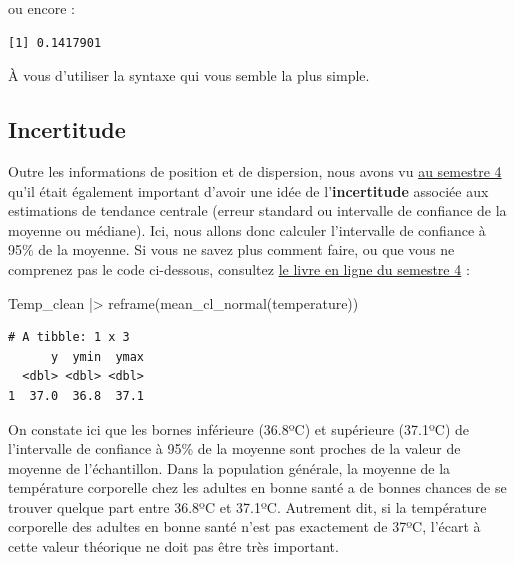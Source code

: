 \documentclass[
  french,
  a4paper,
  DIV=11,
  numbers=noendperiod,
  oneside]{scrreprt}
\newenvironment{Shaded}{}{}
\newcommand{\FunctionTok}[1]{\textcolor[rgb]{0.44,0.26,0.76}{#1}}
\newcommand{\NormalTok}[1]{\textcolor[rgb]{0.14,0.16,0.18}{#1}}
\newcommand{\SpecialCharTok}[1]{\textcolor[rgb]{0.00,0.36,0.77}{#1}}
\begin{document}
ou encore :

\begin{Shaded}
\end{Shaded}

\begin{verbatim}
[1] 0.1417901
\end{verbatim}

À vous d'utiliser la syntaxe qui vous semble la plus simple.

\subsection{Incertitude}\label{sec-ic95}

Outre les informations de position et de dispersion, nous avons vu
\href{https://besibo.github.io/BiometrieS4/02-incertitude.html\#la-notion-dincertitude}{au
semestre 4} qu'il était également important d'avoir une idée de
l'\textbf{incertitude} associée aux estimations de tendance centrale
(erreur standard ou intervalle de confiance de la moyenne ou médiane).
Ici, nous allons donc calculer l'intervalle de confiance à 95\% de la
moyenne. Si vous ne savez plus comment faire, ou que vous ne comprenez
pas le code ci-dessous, consultez
\href{https://besibo.github.io/BiometrieS4/02-incertitude.html\#sec-confint}{le
livre en ligne du semestre 4} :

\begin{Shaded}
\begin{Highlighting}[]
\NormalTok{Temp\_clean }\SpecialCharTok{|\textgreater{}} 
  \FunctionTok{reframe}\NormalTok{(}\FunctionTok{mean\_cl\_normal}\NormalTok{(temperature))}
\end{Highlighting}
\end{Shaded}

\begin{verbatim}
# A tibble: 1 x 3
      y  ymin  ymax
  <dbl> <dbl> <dbl>
1  37.0  36.8  37.1
\end{verbatim}

On constate ici que les bornes inférieure (36.8ºC) et supérieure
(37.1ºC) de l'intervalle de confiance à 95\% de la moyenne sont proches
de la valeur de moyenne de l'échantillon. Dans la population générale,
la moyenne de la température corporelle chez les adultes en bonne santé
a de bonnes chances de se trouver quelque part entre 36.8ºC et 37.1ºC.
Autrement dit, si la température corporelle des adultes en bonne santé
n'est pas exactement de 37ºC, l'écart à cette valeur théorique ne doit
pas être très important.
\end{document}
